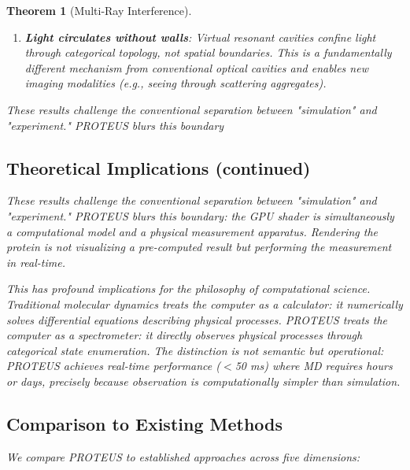 \documentclass[11pt,a4paper]{article}
\newtheorem{theorem}{Theorem}[section]
\begin{document}
\begin{theorem}[Multi-Ray Interference]
\begin{enumerate}
\item \textbf{Light circulates without walls}: Virtual resonant cavities confine light through categorical topology, not spatial boundaries. This is a fundamentally different mechanism from conventional optical cavities and enables new imaging modalities (e.g., seeing through scattering aggregates).
\end{enumerate}

These results challenge the conventional separation between "simulation" and "experiment." PROTEUS blurs this boundary
\subsection{Theoretical Implications (continued)}

These results challenge the conventional separation between "simulation" and "experiment." PROTEUS blurs this boundary: the GPU shader is simultaneously a computational model and a physical measurement apparatus. Rendering the protein is not visualizing a pre-computed result but performing the measurement in real-time.

This has profound implications for the philosophy of computational science. Traditional molecular dynamics treats the computer as a calculator: it numerically solves differential equations describing physical processes. PROTEUS treats the computer as a spectrometer: it directly observes physical processes through categorical state enumeration. The distinction is not semantic but operational: PROTEUS achieves real-time performance ($<$50 ms) where MD requires hours or days, precisely because observation is computationally simpler than simulation.

\subsection{Comparison to Existing Methods}

We compare PROTEUS to established approaches across five dimensions:


\end{theorem}
\end{document}
